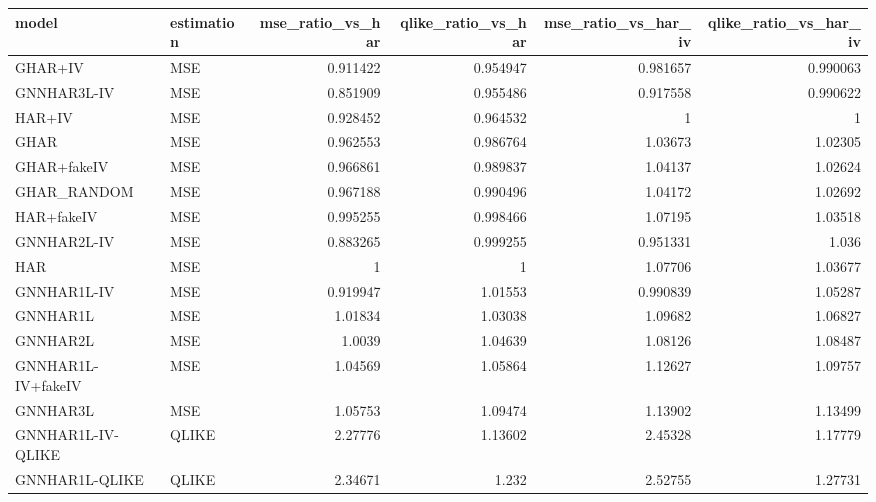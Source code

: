 \begin{tabular}{llrrrr}
\toprule
model & estimation & mse_ratio_vs_har & qlike_ratio_vs_har & mse_ratio_vs_har_iv & qlike_ratio_vs_har_iv \\
\midrule
GHAR+IV & MSE & 0.911422 & 0.954947 & 0.981657 & 0.990063 \\
GNNHAR3L-IV & MSE & 0.851909 & 0.955486 & 0.917558 & 0.990622 \\
HAR+IV & MSE & 0.928452 & 0.964532 & 1 & 1 \\
GHAR & MSE & 0.962553 & 0.986764 & 1.03673 & 1.02305 \\
GHAR+fakeIV & MSE & 0.966861 & 0.989837 & 1.04137 & 1.02624 \\
GHAR_RANDOM & MSE & 0.967188 & 0.990496 & 1.04172 & 1.02692 \\
HAR+fakeIV & MSE & 0.995255 & 0.998466 & 1.07195 & 1.03518 \\
GNNHAR2L-IV & MSE & 0.883265 & 0.999255 & 0.951331 & 1.036 \\
HAR & MSE & 1 & 1 & 1.07706 & 1.03677 \\
GNNHAR1L-IV & MSE & 0.919947 & 1.01553 & 0.990839 & 1.05287 \\
GNNHAR1L & MSE & 1.01834 & 1.03038 & 1.09682 & 1.06827 \\
GNNHAR2L & MSE & 1.0039 & 1.04639 & 1.08126 & 1.08487 \\
GNNHAR1L-IV+fakeIV & MSE & 1.04569 & 1.05864 & 1.12627 & 1.09757 \\
GNNHAR3L & MSE & 1.05753 & 1.09474 & 1.13902 & 1.13499 \\
GNNHAR1L-IV-QLIKE & QLIKE & 2.27776 & 1.13602 & 2.45328 & 1.17779 \\
GNNHAR1L-QLIKE & QLIKE & 2.34671 & 1.232 & 2.52755 & 1.27731 \\
\bottomrule
\end{tabular}
